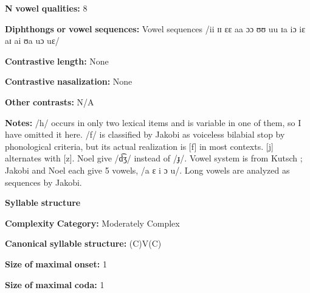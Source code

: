 \documentclass[output=paper]{langsci/langscibook}
\begin{document}
\begin{styleBody}
\textbf{N} \textbf{vowel} \textbf{qualities:} 8
\end{styleBody}

\begin{styleBody}
\textbf{Diphthongs} \textbf{or} \textbf{vowel} \textbf{sequences:} Vowel sequences /ii ɪɪ ɛɛ aa ɔɔ ʊʊ uu ɪa iɔ iɛ aɪ ai ʊa uɔ uɛ/
\end{styleBody}

\begin{styleBody}
\textbf{Contrastive} \textbf{length:} None
\end{styleBody}

\begin{styleBody}
\textbf{Contrastive} \textbf{nasalization:} None
\end{styleBody}

\begin{styleBody}
\textbf{Other} \textbf{contrasts:} N/A
\end{styleBody}

\begin{styleBody}
\textbf{Notes:} /h/ occurs in only two lexical items and is variable in one of them, so I have omitted it here. /f/ is classified by Jakobi as voiceless bilabial stop by phonological criteria, but its actual realization is [f] in most contexts. [j] alternates with [z]. Noel give /d͡ʒ/ instead of /ɟ/. Vowel system is from Kutsch \citet{LojengaWaag2004}; Jakobi and Noel each give 5 vowels, /a ɛ i ɔ u/. Long vowels are analyzed as sequences by Jakobi.
\end{styleBody}

\begin{styleBody}
\textbf{Syllable} \textbf{structure}
\end{styleBody}

\begin{styleBody}
\textbf{Complexity} \textbf{Category:} Moderately Complex
\end{styleBody}

\begin{styleBody}
\textbf{Canonical} \textbf{syllable} \textbf{structure:} (C)V(C) \citep[53-8]{Jakobi1990}
\end{styleBody}

\begin{styleBody}
\textbf{Size} \textbf{of} \textbf{maximal} \textbf{onset:} 1
\end{styleBody}

\begin{styleBody}
\textbf{Size} \textbf{of} \textbf{maximal} \textbf{coda:} 1
\end{styleBody}
\end{document}
